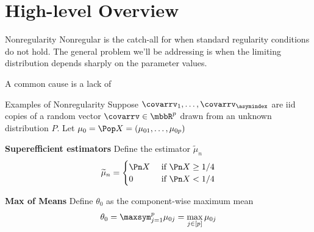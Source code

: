 \documentclass[aspectratio=169, professionalfonts]{beamer}
\begin{document}




\section{High-level Overview}
\begin{frame}{Nonregularity}
	Nonregular is the catch-all for when standard regularity conditions do
	not hold.
	\vfill \pause
	The general problem we'll be addressing is when the limiting
	distribution depends sharply on the parameter values.

	\vfill
	A common cause is a lack of

	\vfill
\end{frame}

\begin{frame}{Examples of Nonregularity}
	Suppose $\covarrv_1, \ldots, \covarrv_{\asymindex}$ are iid copies of a random vector
	$\covarrv \in \mbbR^{p}$ drawn from an unknown distribution $P$. Let $\mu_0 = \Pop X
		= (\mu_{01}, \ldots, \mu_{0p})$

	\vfill \pause

	\textbf{Superefficient estimators}
	Define the estimator $\widetilde{\mu}_n$
	\begin{displaymath}
		\widetilde{\mu}_n = \begin{cases} \Pn X & \text { if } \Pn X \geq 1/4 \\
              0     & \text { if } \Pn X < 1/4\end{cases}
	\end{displaymath}

	\vfill \pause

	\textbf{Max of Means}
	Define $\theta_0$ as the component-wise maximum mean
	\begin{displaymath}
		\theta_0 = \maxsym_{j = 1}^p \mu_{0j} = \max_{j \in [p]} \mu_{0j}
	\end{displaymath}
\end{frame}
\end{document}

